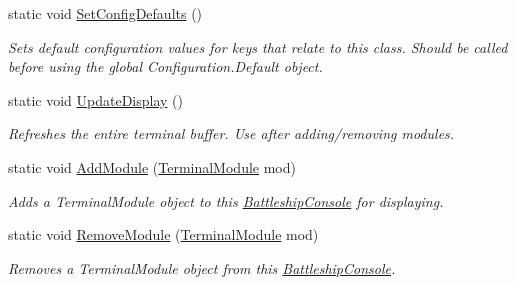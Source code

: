 \begin{DoxyCompactItemize}
\item 
\hypertarget{class_m_b_c_1_1_app_1_1_terminal_1_1_battleship_console_a89c2e64ec8faaaa610e0b48666bd288e}{static void \hyperlink{class_m_b_c_1_1_app_1_1_terminal_1_1_battleship_console_a89c2e64ec8faaaa610e0b48666bd288e}{Set\-Config\-Defaults} ()}\label{class_m_b_c_1_1_app_1_1_terminal_1_1_battleship_console_a89c2e64ec8faaaa610e0b48666bd288e}

\begin{DoxyCompactList}\small\item\em Sets default configuration values for keys that relate to this class. Should be called before using the global Configuration.\-Default object.\end{DoxyCompactList}\item 
\hypertarget{class_m_b_c_1_1_app_1_1_terminal_1_1_battleship_console_a84106eecb3e7447bd0787cd960357a7f}{static void \hyperlink{class_m_b_c_1_1_app_1_1_terminal_1_1_battleship_console_a84106eecb3e7447bd0787cd960357a7f}{Update\-Display} ()}\label{class_m_b_c_1_1_app_1_1_terminal_1_1_battleship_console_a84106eecb3e7447bd0787cd960357a7f}

\begin{DoxyCompactList}\small\item\em Refreshes the entire terminal buffer. Use after adding/removing modules.\end{DoxyCompactList}\item 
\hypertarget{class_m_b_c_1_1_app_1_1_terminal_1_1_battleship_console_a8f7f39ffe8ab6972e283ab2f034c0d7f}{static void \hyperlink{class_m_b_c_1_1_app_1_1_terminal_1_1_battleship_console_a8f7f39ffe8ab6972e283ab2f034c0d7f}{Add\-Module} (\hyperlink{class_m_b_c_1_1_app_1_1_terminal_1_1_modules_1_1_terminal_module}{Terminal\-Module} mod)}\label{class_m_b_c_1_1_app_1_1_terminal_1_1_battleship_console_a8f7f39ffe8ab6972e283ab2f034c0d7f}

\begin{DoxyCompactList}\small\item\em Adds a Terminal\-Module object to this \hyperlink{class_m_b_c_1_1_app_1_1_terminal_1_1_battleship_console}{Battleship\-Console} for displaying.\end{DoxyCompactList}\item 
\hypertarget{class_m_b_c_1_1_app_1_1_terminal_1_1_battleship_console_a77de210e288a093409e51a6420699778}{static void \hyperlink{class_m_b_c_1_1_app_1_1_terminal_1_1_battleship_console_a77de210e288a093409e51a6420699778}{Remove\-Module} (\hyperlink{class_m_b_c_1_1_app_1_1_terminal_1_1_modules_1_1_terminal_module}{Terminal\-Module} mod)}\label{class_m_b_c_1_1_app_1_1_terminal_1_1_battleship_console_a77de210e288a093409e51a6420699778}

\begin{DoxyCompactList}\small\item\em Removes a Terminal\-Module object from this \hyperlink{class_m_b_c_1_1_app_1_1_terminal_1_1_battleship_console}{Battleship\-Console}.\end{DoxyCompactList}\end{DoxyCompactItemize}
